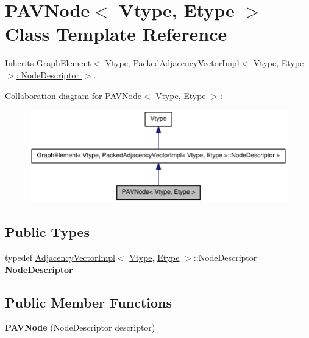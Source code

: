 \hypertarget{class_p_a_v_node}{
\section{PAVNode$<$ Vtype, Etype $>$ Class Template Reference}
\label{class_p_a_v_node}
}


Inherits \hyperlink{class_graph_element}{GraphElement$<$ Vtype, PackedAdjacencyVectorImpl$<$ Vtype, Etype $>$::NodeDescriptor $>$}.



Collaboration diagram for PAVNode$<$ Vtype, Etype $>$:\nopagebreak
\begin{figure}[H]
\begin{center}
\leavevmode
\includegraphics[width=400pt]{class_p_a_v_node__coll__graph}
\end{center}
\end{figure}
\subsection*{Public Types}
\begin{DoxyCompactItemize}
\item 
\hypertarget{class_p_a_v_node_ad271a06aa3445805740efa55877a06ff}{
typedef \hyperlink{class_adjacency_vector_impl}{AdjacencyVectorImpl}$<$ \hyperlink{class_vtype}{Vtype}, \hyperlink{class_etype}{Etype} $>$::NodeDescriptor {\bfseries NodeDescriptor}}
\label{class_p_a_v_node_ad271a06aa3445805740efa55877a06ff}

\end{DoxyCompactItemize}
\subsection*{Public Member Functions}
\begin{DoxyCompactItemize}
\item 
\hypertarget{class_p_a_v_node_a210d7bac40a554f761b70144e820e58f}{
{\bfseries PAVNode} (NodeDescriptor descriptor)}
\label{class_p_a_v_node_a210d7bac40a554f761b70144e820e58f}

\end{DoxyCompactItemize}
